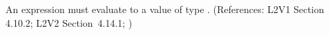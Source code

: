 An \Event {} expression must evaluate to a value of type
.  (References: L2V1 Section 4.10.2; L2V2 Section~4.14.1;
)
